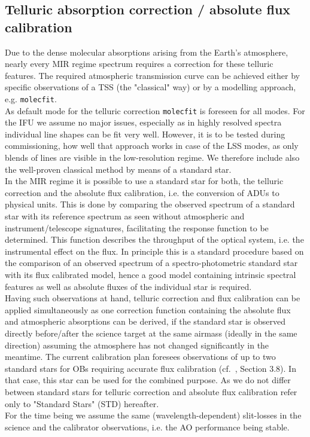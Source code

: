
\subsection{Telluric absorption correction / absolute flux calibration}\label{ssec:tellcorr}
Due to the dense molecular absorptions arising from the Earth's atmosphere, nearly every \ac{MIR} regime spectrum requires a correction for these telluric features. The required atmospheric transmission curve can be achieved either by specific observations of a \ac{TSS} (the "classical" way) or by a modelling approach, e.g. \texttt{molecfit}.\\
As default mode for the telluric correction \texttt{molecfit} is foreseen for all modes. For the \ac{IFU} we assume no major issues, especially as in highly resolved spectra individual line shapes can be fit very well. However, it is to be tested during commissioning, how well that approach works in case of the \ac{LSS} modes, as only blends of lines are visible in the low-resolution regime. We therefore include also the well-proven classical method by means of a standard star.\\
In the \ac{MIR} regime it is possible to use a standard star for both, the telluric correction and the absolute flux calibration, i.e. the conversion of \ac{ADU}s to physical units. This is done by comparing the observed spectrum of a standard star with its reference spectrum as seen without atmospheric and instrument/telescope signatures, facilitating the response function to be determined. This function describes the throughput of the optical system, i.e. the instrumental effect on the flux. In principle this is a standard procedure based on the comparison of an observed spectrum of a spectro-photometric standard star with its flux calibrated model, hence a good model containing intrinsic spectral features as well as absolute fluxes of the individual star is required.\\
Having such observations at hand, telluric correction and flux calibration can be applied simultaneously as one correction function containing the absolute flux and atmospheric absorptions can be derived, if the standard star is observed directly before/after the science target at the same airmass (ideally in the same direction) assuming the atmosphere has not changed significantly in the meantime. The current calibration plan foresees observations of up to two standard stars for \ac{OB}s requiring accurate flux calibration (cf.~\cite{METIS-calibration_plan}, Section 3.8). In that case, this star can be used for the combined purpose. As we do not differ between standard stars for telluric correction and absolute flux calibration refer only to "Standard Stars" (STD) hereafter.\\
For the time being we assume the same (wavelength-dependent) slit-losses in the science and the calibrator observations, i.e. the \ac{AO} performance being stable.  \\

